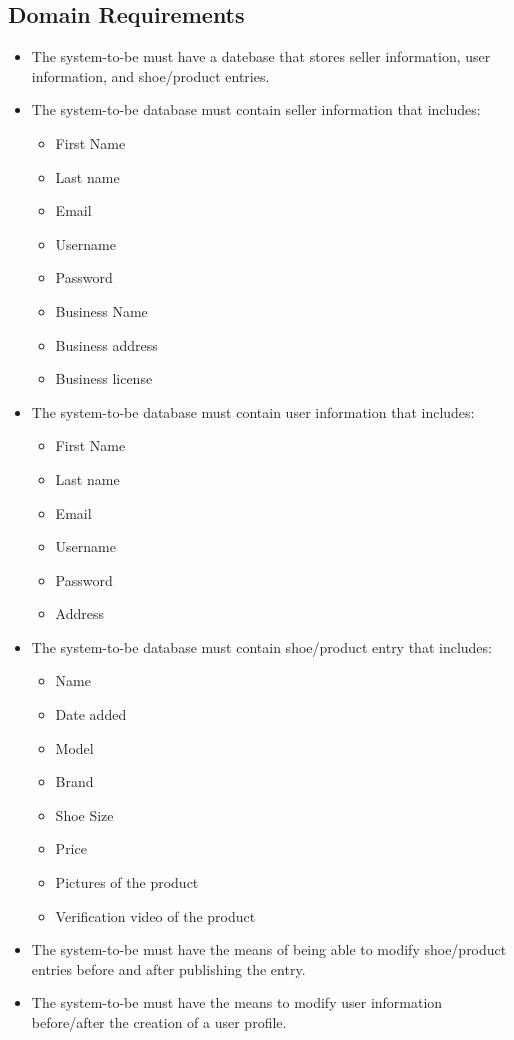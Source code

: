 \subsection{Domain Requirements}
\begin{itemize}
  \item The system-to-be must have a datebase that stores seller information, user information, and shoe/product entries.
  \item The system-to-be database must contain seller information that includes:
        \begin{itemize}
          \item First Name
          \item Last name
          \item Email
          \item Username
          \item Password
          \item Business Name
          \item Business address
          \item Business license
        \end{itemize}
  \item The system-to-be database must contain user information that includes:
      \begin{itemize}
          \item First Name
          \item Last name
          \item Email
          \item Username
          \item Password
        \item Address
      \end{itemize}
  \item The system-to-be database must contain shoe/product entry that includes:
        \begin{itemize}
          \item Name
          \item Date added
          \item Model
          \item Brand
          \item Shoe Size
          \item Price
          \item Pictures of the product
          \item Verification video of the product
        \end{itemize}
  \item The system-to-be must have the means of being able to modify shoe/product entries before and after publishing the entry.
  \item The system-to-be must have the means to modify user information before/after the creation of a user profile.
\end{itemize}
